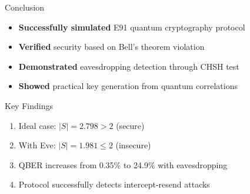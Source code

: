\documentclass[10pt]{beamer}
\begin{document}
\begin{frame}{Conclusion}
    \begin{itemize}
        \item \textbf{Successfully simulated} E91 quantum cryptography protocol
        \item \textbf{Verified} security based on Bell's theorem violation
        \item \textbf{Demonstrated} eavesdropping detection through CHSH test
        \item \textbf{Showed} practical key generation from quantum correlations
    \end{itemize}
    
    \vspace{5mm}
    \begin{block}{Key Findings}
        \begin{enumerate}
            \item Ideal case: $|S| = 2.798 > 2$ (secure)
            \item With Eve: $|S| = 1.981 \leq 2$ (insecure)
            \item QBER increases from 0.35\% to 24.9\% with eavesdropping
            \item Protocol successfully detects intercept-resend attacks
        \end{enumerate}
    \end{block}
\end{frame}
\end{document}
